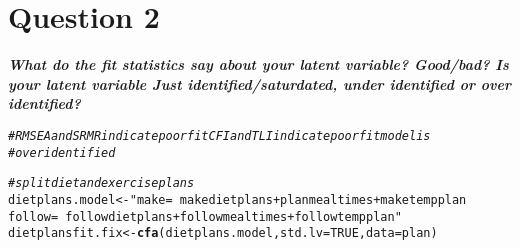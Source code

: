 \documentclass{article}\usepackage[]{graphicx}\usepackage[]{color}
\makeatletter
\newcommand{\hlnum}[1]{\textcolor[rgb]{0.686,0.059,0.569}{#1}}%
\newcommand{\hlstr}[1]{\textcolor[rgb]{0.192,0.494,0.8}{#1}}%
\newcommand{\hlcom}[1]{\textcolor[rgb]{0.678,0.584,0.686}{\textit{#1}}}%
\newcommand{\hlstd}[1]{\textcolor[rgb]{0.345,0.345,0.345}{#1}}%
\newcommand{\hlkwb}[1]{\textcolor[rgb]{0.69,0.353,0.396}{#1}}%
\newcommand{\hlkwc}[1]{\textcolor[rgb]{0.333,0.667,0.333}{#1}}%
\newcommand{\hlkwd}[1]{\textcolor[rgb]{0.737,0.353,0.396}{\textbf{#1}}}%
\newenvironment{kframe}{%
 \def\at@end@of@kframe{}%
 \ifinner\ifhmode%
  \def\at@end@of@kframe{\end{minipage}}%
  \begin{minipage}{\columnwidth}%
 \fi\fi%
 \def\FrameCommand##1{\hskip\@totalleftmargin \hskip-\fboxsep
 \colorbox{shadecolor}{##1}\hskip-\fboxsep
     \hskip-\linewidth \hskip-\@totalleftmargin \hskip\columnwidth}%
 \MakeFramed {\advance\hsize-\width
   \@totalleftmargin\z@ \linewidth\hsize
   \@setminipage}}%
 {\par\unskip\endMakeFramed%
 \at@end@of@kframe}
\newenvironment{knitrout}{}{} %
\makeatother
\begin{document}
\section{Question 2}
\textbf{\large{\textit{
What do the fit statistics say about your latent variable? Good/bad? Is your latent variable Just identified/saturdated, under identified or over identified?
}}}

\begin{knitrout}
\color{fgcolor}\begin{kframe}
\begin{alltt}
\hlcom{# RMSEA and SRMR indicate poor fit CFI and TLI indicate poor fit model is}
\hlcom{# overidentified}

\hlcom{# split diet and exercise plans}
\hlstd{dietplans.model} \hlkwb{<-} \hlstr{" make  =~ makedietplans + planmealtimes + maketempplan     
              follow =~ followdietplans + followmealtimes + followtempplan"}
\hlstd{dietplansfit.fix} \hlkwb{<-} \hlkwd{cfa}\hlstd{(dietplans.model,} \hlkwc{std.lv} \hlstd{=} \hlnum{TRUE}\hlstd{,} \hlkwc{data} \hlstd{= plan)}
\end{alltt}



\end{kframe}
\end{knitrout}
\end{document}
